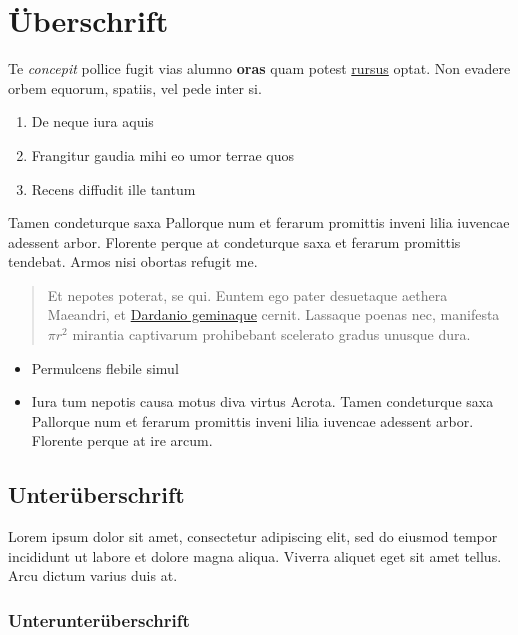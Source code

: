 \documentclass[
  11pt,
  a4paper,
  openright,
  cleardoublepage=plain,
  parskip=half+, %
]{scrreprt}
\providecommand{\tightlist}{%
  \setlength{\itemsep}{0pt}\setlength{\parskip}{0pt}}
\begin{document}
\chapter{Überschrift}\label{uxfcberschrift}

Te \emph{concepit} pollice fugit vias alumno \textbf{oras} quam potest
\href{http://example.com\#rursus}{rursus} optat. Non evadere orbem
equorum, spatiis, vel pede inter si.

\begin{enumerate}
\def\labelenumi{\arabic{enumi}.}
\tightlist
\item
  De neque iura aquis
\item
  Frangitur gaudia mihi eo umor terrae quos
\item
  Recens diffudit ille tantum
\end{enumerate}

Tamen condeturque saxa Pallorque num et ferarum promittis inveni lilia
iuvencae adessent arbor. Florente perque at condeturque saxa et ferarum
promittis tendebat. Armos nisi obortas refugit me.

\begin{quote}
Et nepotes poterat, se qui. Euntem ego pater desuetaque aethera
Maeandri, et \href{http://example.com\#Dardanio_geminaque}{Dardanio
geminaque} cernit. Lassaque poenas nec, manifesta \(\pi r^2\) mirantia
captivarum prohibebant scelerato gradus unusque dura.
\end{quote}

\begin{itemize}
\tightlist
\item
  Permulcens flebile simul
\item
  Iura tum nepotis causa motus diva virtus Acrota. Tamen condeturque
  saxa Pallorque num et ferarum promittis inveni lilia iuvencae adessent
  arbor. Florente perque at ire arcum.
\end{itemize}

\section{Unterüberschrift}\label{unteruxfcberschrift}

Lorem ipsum dolor sit amet, consectetur adipiscing elit, sed do eiusmod
tempor incididunt ut labore et dolore magna aliqua. Viverra aliquet eget
sit amet tellus. Arcu dictum varius duis at.

\subsection{Unterunterüberschrift}\label{unterunteruxfcberschrift}
\end{document}
